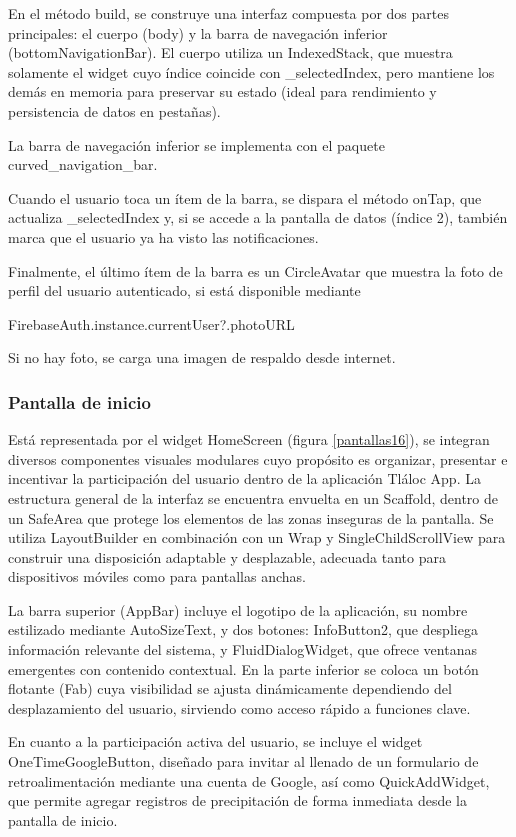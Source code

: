 En el método build, se construye una interfaz compuesta por dos partes principales: el cuerpo (body) y la barra de navegación inferior (bottomNavigationBar). El cuerpo utiliza un IndexedStack, que muestra solamente el widget cuyo índice coincide con \_selectedIndex, pero mantiene los demás en memoria para preservar su estado (ideal para rendimiento y persistencia de datos en pestañas).

La barra de navegación inferior se implementa con el paquete curved\_navigation\_bar.

Cuando el usuario toca un ítem de la barra, se dispara el método onTap, que actualiza \_selectedIndex y, si se accede a la pantalla de datos (índice 2), también marca que el usuario ya ha visto las notificaciones.

Finalmente, el último ítem de la barra es un CircleAvatar que muestra la foto de perfil del usuario autenticado, si está disponible mediante 
\begin{center}
  FirebaseAuth.instance.currentUser?.photoURL
\end{center}
Si no hay foto, se carga una imagen de respaldo desde internet.

\newpage
\subsubsection*{Pantalla de inicio} 

Está representada por el widget HomeScreen (figura \ref{pantallas16}), se integran diversos componentes visuales modulares cuyo propósito es organizar, presentar e incentivar la participación del usuario dentro de la aplicación Tláloc App. La estructura general de la interfaz se encuentra envuelta en un Scaffold, dentro de un SafeArea que protege los elementos de las zonas inseguras de la pantalla. Se utiliza LayoutBuilder en combinación con un Wrap y SingleChildScrollView para construir una disposición adaptable y desplazable, adecuada tanto para dispositivos móviles como para pantallas anchas.

La barra superior (AppBar) incluye el logotipo de la aplicación, su nombre estilizado mediante AutoSizeText, y dos botones: InfoButton2, que despliega información relevante del sistema, y FluidDialogWidget, que ofrece ventanas emergentes con contenido contextual. En la parte inferior se coloca un botón flotante (Fab) cuya visibilidad se ajusta dinámicamente dependiendo del desplazamiento del usuario, sirviendo como acceso rápido a funciones clave.

En cuanto a la participación activa del usuario, se incluye el widget OneTimeGoogleButton, diseñado para invitar al llenado de un formulario de retroalimentación mediante una cuenta de Google, así como QuickAddWidget, que permite agregar registros de precipitación de forma inmediata desde la pantalla de inicio.

